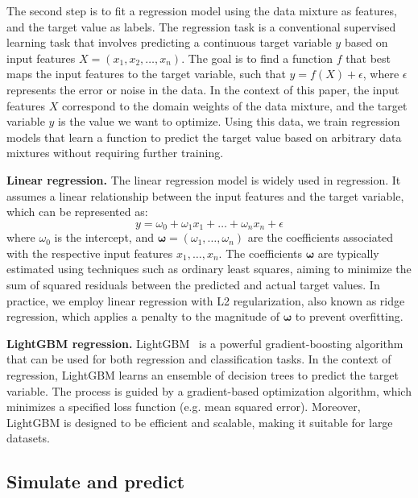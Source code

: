 \documentclass{article}
\theoremstyle{definition}
\theoremstyle{remark}
\begin{document}
The second step is to fit a regression model using the data mixture as features, and the target value as labels.
The regression task is a conventional supervised learning task that involves predicting a continuous target variable $y$ based on input features $X = (x_1, x_2, \ldots, x_n)$. The goal is to find a function $f$ that best maps the input features to the target variable, such that $y=f(X) +\epsilon$, where $\epsilon$ represents the error or noise in the data. In the context of this paper, the input features $X$ correspond to the domain weights of the data mixture, and the target variable $y$ is the value we want to optimize. Using this data, we train regression models that learn a function to predict the target value based on arbitrary data mixtures without requiring further training.

\textbf{Linear regression.}\;\;
The linear regression model is widely used in regression. It assumes a linear relationship between the input features and the target variable, which can be represented as:
\begin{equation}
y = \omega_0 + \omega_1 x_1 + \ldots + \omega_n x_n + \epsilon
\end{equation}
where $\omega_0$ is the intercept, and $\boldsymbol{\omega}=(\omega_1, \ldots, \omega_n)$ are the coefficients associated with the respective input features $x_1, \ldots, x_n$.
The coefficients $\boldsymbol{\omega}$ are typically estimated using techniques such as ordinary least squares, aiming to minimize the sum of squared residuals between the predicted and actual target values. In practice, we employ linear regression with L2 regularization, also known as ridge regression, which applies a penalty to the magnitude of $\boldsymbol{\omega}$ to prevent overfitting.

\textbf{LightGBM regression.}\;\;
LightGBM~\citep{ke2017lightgbm} is a powerful gradient-boosting algorithm that can be used for both regression and classification tasks. In the context of regression, LightGBM learns an ensemble of decision trees to predict the target variable. 
The process is guided by a gradient-based optimization algorithm, which minimizes a specified loss function (e.g. mean squared error). Moreover, LightGBM is designed to be efficient and scalable, making it suitable for large datasets.

\subsection{Simulate and predict}
\end{document}
